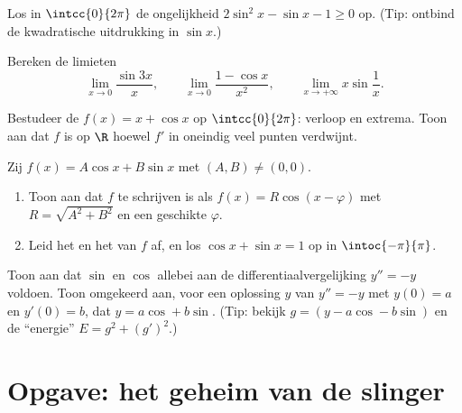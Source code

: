 \begin{exercise}[$\star\star$]\label{exo:g12:trigo:5}
Los in $\intcc{0}{2\pi}$ de ongelijkheid $2\sin^2 x - \sin x - 1 \geq 0$ op.
(Tip: ontbind de kwadratische uitdrukking in $\sin x$.)
\end{exercise}

\begin{exercise}[$\star\star$]\label{exo:g12:trigo:6}
Bereken de limieten
\[
\lim_{x\to0} \frac{\sin 3x}{x}, \qquad
\lim_{x\to0} \frac{1 - \cos x}{x^2}, \qquad
\lim_{x\to+\infty} x \sin\frac{1}{x}.
\]
\end{exercise}

\begin{exercise}[$\star\star$]\label{exo:g12:trigo:7}
Bestudeer de  $f(x) = x + \cos x$ op $\intcc{0}{2\pi}$: verloop en
extrema. Toon aan dat $f$  is op $\R$ hoewel $f'$ in oneindig veel
punten verdwijnt.
\end{exercise}

\begin{exercise}[$\star\star\star$]\label{exo:g12:trigo:8}
Zij $f(x) = A\cos x + B \sin x$ met $(A,B) \neq (0,0)$.
\begin{enumerate}
  \item Toon aan dat $f$ te schrijven is als $f(x) = R\cos(x - \varphi)$ met
        $R = \sqrt{A^2 + B^2}$ en een geschikte $\varphi$.
  \item Leid het  en het  van $f$ af, en los
        $\cos x + \sin x = 1$ op in $\intoc{-\pi}{\pi}$.
\end{enumerate}
\end{exercise}

\begin{exercise}[$\star\star\star$]\label{exo:g12:trigo:9}
Toon aan dat $\sin$ en $\cos$ allebei aan de differentiaalvergelijking
$y'' = -y$ voldoen. Toon omgekeerd aan, voor een oplossing $y$ van
$y'' = -y$ met $y(0) = a$ en $y'(0) = b$, dat $y = a\cos + b\sin$. (Tip:
bekijk $g = (y - a\cos - b\sin)$ en de ``energie'' $E = g^2 + (g')^2$.)
\end{exercise}

\section{Opgave: het geheim van de slinger}

